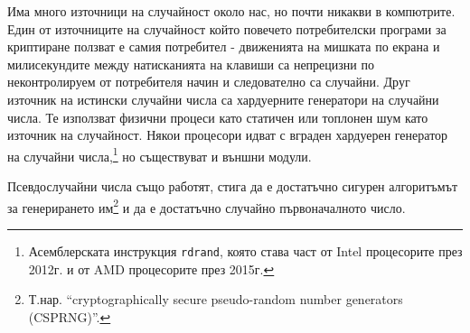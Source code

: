 Има много източници на случайност около нас, но почти никакви в компютрите. Един от източниците на случайност който повечето потребителски програми за криптиране ползват е самия потребител - движенията на мишката по екрана и милисекундите между натисканията на клавиши са непрецизни по неконтролируем от потребителя начин и следователно са случайни. Друг източник на истински случайни числа са хардуерните генератори на случайни числа. Те използват физични процеси като статичен или топлонен шум като източник на случайност. Някои процесори идват с вграден хардуерен генератор на случайни числа,\footnote{Асемблерската инструкция {\tt rdrand}, която става част от Intel процесорите през 2012г. и от AMD процесорите през 2015г.} но съществуват и външни модули.

Псевдослучайни числа също работят, стига да е достатъчно сигурен алгоритъмът за генерирането им\footnote{Т.нар. ``cryptographically secure pseudo-random number generators (CSPRNG)''.} и да е достатъчно случайно първоначалното число.
